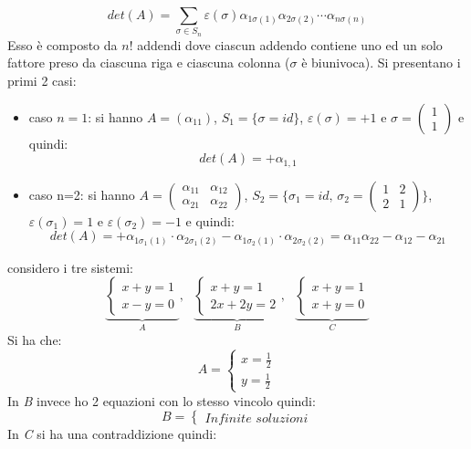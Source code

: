 \documentclass[a4paper,12pt, oneside]{book}
\begin{document}
\begin{shaded}
\begin{definizione}[bonus]
$$det(A)=\sum_{\sigma\in S_n} \varepsilon(\sigma)\alpha_{1\sigma(1)}\alpha_{2\sigma(2)}\cdots \alpha_{n\sigma(n)}$$
Esso è composto da $n!$ addendi dove ciascun addendo contiene uno ed un solo fattore preso da ciascuna riga e ciascuna colonna ($\sigma$ è biunivoca). Si presentano i primi 2 casi:
\begin{itemize}
\item caso $n=1$: si hanno $A=(\alpha_{11})$, $S_1=\{\sigma=id\}$, $\varepsilon(\sigma)=+1$ e $
\sigma=\left(\begin{matrix}
1\\
1
\end{matrix}\right)
$ e quindi:
$$det(A)=+\alpha_{1,1}$$
\item caso n=2: si hanno $
A=\left(\begin{matrix}
\alpha_{11} & \alpha_{12}\\
\alpha_{21} & \alpha_{22}
\end{matrix}\right)
$, $S_2=\{\sigma_1=id,\, \sigma_2=\left(\begin{matrix}
1 & 2\\
2 & 1
\end{matrix}\right)\}$, $\varepsilon(\sigma_1)=1$ e $ \varepsilon(\sigma_2)=-1$ e quindi:
$$det(A)=+\alpha_{1\sigma_1(1)}\cdot \alpha_{2\sigma_1(2)}-\alpha_{1\sigma_2(1)}\cdot \alpha_{2\sigma_2(2)}=\alpha_{11}\alpha_{22}-\alpha_{12}-\alpha_{21}$$
\end{itemize}
\end{definizione}
\end{shaded}
considero i tre sistemi:
$$
\underbrace{\begin{cases}
x+y=1\\
x-y=0
\end{cases}}_{A},\,\,\,\,
\underbrace{\begin{cases}
x+y=1\\
2x+2y=2
\end{cases}}_{B},\,\,\,\,
\underbrace{\begin{cases}
x+y=1\\
x+y=0
\end{cases}}_{C}
$$
Si ha che:
$$
A=\begin{cases}
x=\frac{1}{2}\\
y=\frac{1}{2}
\end{cases}
$$
In \textit{B} invece ho 2 equazioni con lo stesso vincolo quindi:
$$
B=\begin{cases}
Infinite\,\, soluzioni
\end{cases}
$$
In \textit{C} si ha una contraddizione quindi:
\end{document}
